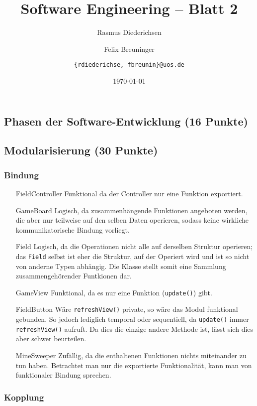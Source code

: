\documentclass{scrartcl}
\title{\rmfamily Software Engineering -- Blatt 2}
\author{Rasmus Diederichsen \and Felix Breuninger\and %
   \texttt{\{rdiederichse, fbreunin\}@uos.de}
}
\date{\today}
\begin{document}
\selectfont
\maketitle


\setcounter{section}{2}
\setcounter{subsection}{0}
\subsection{Phasen der Software-Entwicklung (16 Punkte)}
\subsection{Modularisierung (30 Punkte)}


\subsubsection{Bindung}

\begin{itemize}[font=\ttfamily,leftmargin=2cm,align=left]
   \item[FieldController] Funktional da der Controller nur eine Funktion
      exportiert.
   \item[GameBoard] Logisch, da zusammenhängende Funktionen angeboten werden,
      die aber nur teilweise auf den selben Daten operieren, sodass keine
      wirkliche kommunikatorische Bindung vorliegt.
   \item[Field] Logisch, da die Operationen nicht alle auf derselben Struktur
      operieren; das \texttt{Field} selbst ist eher die Struktur, auf der
      Operiert wird und ist so nicht von anderne Typen abhängig. Die Klasse
      stellt somit eine Sammlung zusammengehörender Funtkionen dar.
   \item[GameView] Funktional, da es nur eine Funktion (\texttt{update()}) gibt.
   \item[FieldButton] Wäre \texttt{refreshView()} private, so wäre das Modul
      funktional gebunden. So jedoch lediglich temporal oder sequentiell, da
      \texttt{update()} immer \texttt{refreshView()} aufruft. Da dies die
      einzige andere Methode ist, lässt sich dies aber schwer beurteilen.
   \item[MineSweeper] Zufällig, da die enthaltenen Funktionen nichts miteinander
      zu tun haben. Betrachtet man nur die exportierte Funktionalität, kann man
      von funktionaler Bindung sprechen.
\end{itemize}

\subsubsection{Kopplung}
\end{document}
